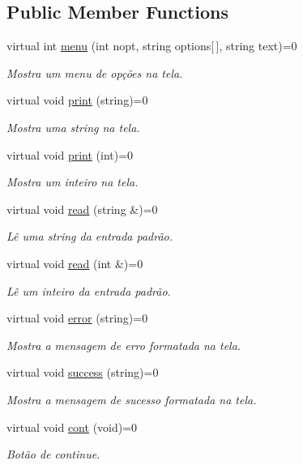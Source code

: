 \subsection*{Public Member Functions}
\begin{DoxyCompactItemize}
\item 
virtual int \hyperlink{classWindow_a3b6d7449c7f088f9ce59002573ca82c0}{menu} (int nopt, string options\mbox{[}$\,$\mbox{]}, string text)=0
\begin{DoxyCompactList}\small\item\em Mostra um menu de opções na tela. \end{DoxyCompactList}\item 
virtual void \hyperlink{classWindow_a4fd86bca046073b3429f221c2f3bb690}{print} (string)=0
\begin{DoxyCompactList}\small\item\em Mostra uma string na tela. \end{DoxyCompactList}\item 
virtual void \hyperlink{classWindow_aa0a1210e72a63332e49722f1f878ea94}{print} (int)=0
\begin{DoxyCompactList}\small\item\em Mostra um inteiro na tela. \end{DoxyCompactList}\item 
virtual void \hyperlink{classWindow_abb59602c637907250fd70b1450b85c5c}{read} (string \&)=0
\begin{DoxyCompactList}\small\item\em Lê uma string da entrada padrão. \end{DoxyCompactList}\item 
virtual void \hyperlink{classWindow_ab00a4c057aade6ddc2a4bb22b2a6de42}{read} (int \&)=0
\begin{DoxyCompactList}\small\item\em Lê um inteiro da entrada padrão. \end{DoxyCompactList}\item 
virtual void \hyperlink{classWindow_a2e661d42cd6e7b9c737530f4e34c87f1}{error} (string)=0
\begin{DoxyCompactList}\small\item\em Mostra a mensagem de erro formatada na tela. \end{DoxyCompactList}\item 
virtual void \hyperlink{classWindow_af625e87e68e0510c2fc11f1dc2d42f0e}{success} (string)=0
\begin{DoxyCompactList}\small\item\em Mostra a mensagem de sucesso formatada na tela. \end{DoxyCompactList}\item 
virtual void \hyperlink{classWindow_a286992c7c1720f5e3e12a6b70364b812}{cont} (void)=0
\begin{DoxyCompactList}\small\item\em Botão de continue. \end{DoxyCompactList}\end{DoxyCompactItemize}


